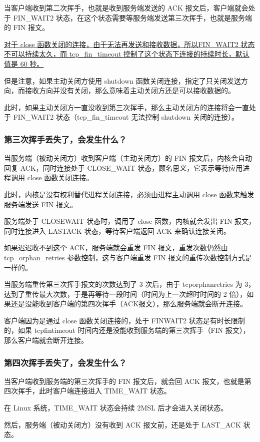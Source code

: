 \documentclass[11pt]{article}
\begin{document}
当客户端收到第二次挥手，也就是收到服务端发送的 ACK 报文后，客户端就会处于 FIN\_WAIT2 状态，在这个状态需要等服务端发送第三次挥手，也就是服务端的 FIN 报文。

\uline{对于 close 函数关闭的连接，由于无法再发送和接收数据，所以FIN\_WAIT2 状态不可以持续太久，而 tcp\_fin\_timeout 控制了这个状态下连接的持续时长，默认值是 60 秒。}

但是注意，如果主动关闭方使用 shutdown 函数关闭连接，指定了只关闭发送方向，而接收方向并没有关闭，那么意味着主动关闭方还是可以接收数据的。

此时，如果主动关闭方一直没收到第三次挥手，那么主动关闭方的连接将会一直处于 FIN\_WAIT2 状态（tcp\_fin\_timeout 无法控制 shutdown 关闭的连接）。
\subsubsection{第三次挥手丢失了，会发生什么？}
\label{sec:orgb6a27e3}
当服务端（被动关闭方）收到客户端（主动关闭方）的 FIN 报文后，内核会自动回复 ACK，同时连接处于 CLOSE\_WAIT 状态，顾名思义，它表示等待应用进程调用 close 函数关闭连接。

此时，内核是没有权利替代进程关闭连接，必须由进程主动调用 close 函数来触发服务端发送 FIN 报文。

服务端处于 CLOSEWAIT 状态时，调用了 close 函数，内核就会发出 FIN 报文，同时连接进入 LASTACK 状态，等待客户端返回 ACK 来确认连接关闭。

如果迟迟收不到这个 ACK，服务端就会重发 FIN 报文，重发次数仍然由 tcp\_orphan\_retries 参数控制，这与客户端重发 FIN 报文的重传次数控制方式是一样的。

当服务端重传第三次挥手报文的次数达到了 3 次后，由于 tcporphanretries 为 3，达到了重传最大次数，于是再等待一段时间（时间为上一次超时时间的 2 倍），如果还是没能收到客户端的第四次挥手（ACK报文），那么服务端就会断开连接。

客户端因为是通过 close 函数关闭连接的，处于 FINWAIT2 状态是有时长限制的，如果 tcpfintimeout 时间内还是没能收到服务端的第三次挥手（FIN 报文），那么客户端就会断开连接。
\subsubsection{第四次挥手丢失了，会发生什么？}
\label{sec:org6cf5b70}
当客户端收到服务端的第三次挥手的 FIN 报文后，就会回 ACK 报文，也就是第四次挥手，此时客户端连接进入 TIME\_WAIT 状态。

在 Linux 系统，TIME\_WAIT 状态会持续 2MSL 后才会进入关闭状态。

然后，服务端（被动关闭方）没有收到 ACK 报文前，还是处于 LAST\_ACK 状态。
\end{document}

